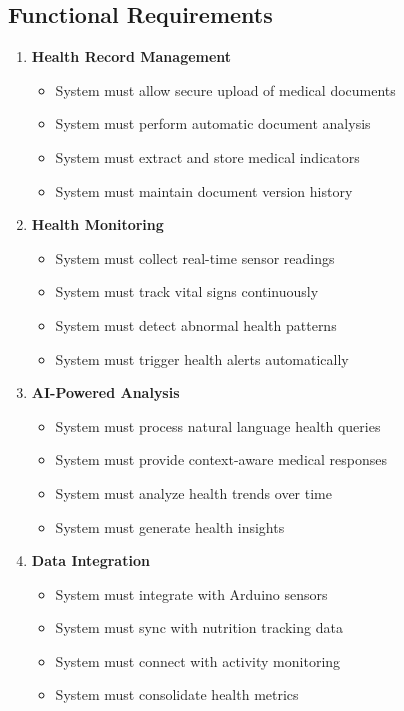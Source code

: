 \subsection{Functional Requirements}

\begin{enumerate}
    \item \textbf{Health Record Management}
    \begin{itemize}
        \item System must allow secure upload of medical documents
        \item System must perform automatic document analysis
        \item System must extract and store medical indicators
        \item System must maintain document version history
    \end{itemize}

    \item \textbf{Health Monitoring}
    \begin{itemize}
        \item System must collect real-time sensor readings
        \item System must track vital signs continuously
        \item System must detect abnormal health patterns
        \item System must trigger health alerts automatically
    \end{itemize}

    \item \textbf{AI-Powered Analysis}
    \begin{itemize}
        \item System must process natural language health queries
        \item System must provide context-aware medical responses
        \item System must analyze health trends over time
        \item System must generate health insights
    \end{itemize}

    \item \textbf{Data Integration}
    \begin{itemize}
        \item System must integrate with Arduino sensors
        \item System must sync with nutrition tracking data
        \item System must connect with activity monitoring
        \item System must consolidate health metrics
    \end{itemize}


\end{enumerate}
